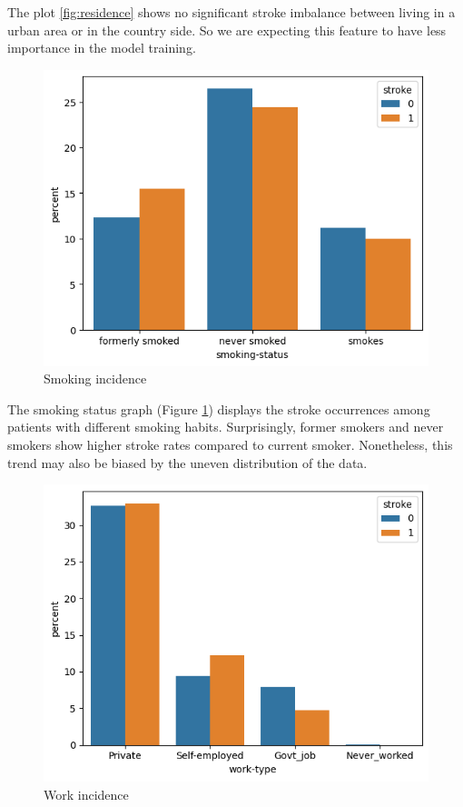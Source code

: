 \documentclass{Configuration_Files/Template}
\begin{document}
The plot \ref{fig:residence} shows no significant stroke imbalance between living in a urban area or in the country side. So we are expecting this feature to have less importance in the model training.


\begin{figure}[h]
\centering
\includegraphics[scale=0.4]{Images/smoking_status_graph.png}
\caption{Smoking incidence}
\label{fig:smoking}
\end{figure}

The smoking status graph (Figure \ref{fig:smoking}) displays the stroke occurrences among patients with different smoking habits. Surprisingly, former smokers and never smokers show higher stroke rates compared to current smoker. Nonetheless, this trend may also be biased by the uneven distribution of the data.

\begin{figure}[h]
\centering
\includegraphics[scale=0.4]{Images/work_type_graph.png}
\caption{Work incidence}
\label{fig:work}
\end{figure}
\end{document}
